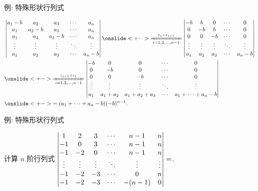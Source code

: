 \begin{frame}{例: 特殊形状行列式}
	\onslide<+->
	\begin{example}
		\begin{align*}
		&\detm{
			a_1-b&a_2&a_3&\cdots&a_n\\
			a_1&a_2-b&a_3&\cdots&a_n\\
			a_1&a_2&a_3-b&\cdots&a_n\\
			\vdots&\vdots&\vdots&\ddots&\vdots\\
			a_1&a_2&a_3&\cdots&a_n-b
		}\onslide<+->{\xeq[i=1,2,\dots,n-1]{r_i-r_{i+1}}
		\detm{
			-b& b& 0&\cdots&0\\
			 0&-b& b&\cdots&0\\
			 0& 0&-b&\cdots&0\\
			\vdots&\vdots&\vdots&\ddots&\vdots\\
			a_1&a_2&a_3&\cdots&a_n-b
		}}\\
		&\onslide<+->{\xeq[i=1,2,\dots,n-1]{c_{i+1}+c_i}
		\detm{
			-b& 0& 0&\cdots&0\\
			 0&-b& 0&\cdots&0\\
			 0& 0&-b&\cdots&0\\
			\vdots&\vdots&\vdots&\ddots&\vdots\\
			a_1&a_1+a_2&a_1+a_2+a_3&\cdots&a_1+\cdots+a_n-b
		}}\\
		&\onslide<+->{=(a_1+\cdots+a_n-b)(-b)^{n-1}.}
	\end{align*}
	\end{example}
\end{frame}


\begin{frame}{例: 特殊形状行列式}
	\onslide<+->
	\begin{exercise}
		计算 $n$ 阶行列式 $\left|\begin{matrix}
			1&2&3&\cdots&n-1&n\\
			-1&0&3&\cdots&n-1&n\\
			-1&-2&0&\cdots&n-1&n\\
			\vdots&\vdots&\vdots&\ddots&\vdots&\vdots\\
			-1&-2&-3&\cdots&0&n\\
			-1&-2&-3&\cdots&-(n-1)&0
		\end{matrix}\right|=$.
	\end{exercise}
\end{frame}



